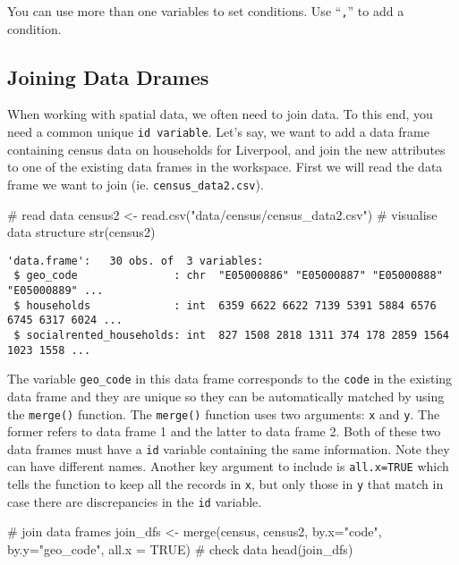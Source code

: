 \documentclass[
  letterpaper,
  krantz2]{style/krantz}
\newenvironment{Shaded}{\begin{snugshade}}{\end{snugshade}}
\newcommand{\AttributeTok}[1]{\textcolor[rgb]{0.40,0.45,0.13}{#1}}
\newcommand{\CommentTok}[1]{\textcolor[rgb]{0.37,0.37,0.37}{#1}}
\newcommand{\ConstantTok}[1]{\textcolor[rgb]{0.56,0.35,0.01}{#1}}
\newcommand{\FunctionTok}[1]{\textcolor[rgb]{0.28,0.35,0.67}{#1}}
\newcommand{\NormalTok}[1]{\textcolor[rgb]{0.00,0.23,0.31}{#1}}
\newcommand{\OtherTok}[1]{\textcolor[rgb]{0.00,0.23,0.31}{#1}}
\newcommand{\StringTok}[1]{\textcolor[rgb]{0.13,0.47,0.30}{#1}}
\begin{document}
You can use more than one variables to set conditions. Use
``\texttt{,}'' to add a condition.

\hypertarget{joining-data-drames}{%
\subsection{Joining Data Drames}\label{joining-data-drames}}

When working with spatial data, we often need to join data. To this end,
you need a common unique \texttt{id\ variable}. Let's say, we want to
add a data frame containing census data on households for Liverpool, and
join the new attributes to one of the existing data frames in the
workspace. First we will read the data frame we want to join (ie.
\texttt{census\_data2.csv}).

\begin{Shaded}
\begin{Highlighting}[]
\CommentTok{\# read data}
\NormalTok{census2 }\OtherTok{\textless{}{-}} \FunctionTok{read.csv}\NormalTok{(}\StringTok{"data/census/census\_data2.csv"}\NormalTok{)}
\CommentTok{\# visualise data structure}
\FunctionTok{str}\NormalTok{(census2)}
\end{Highlighting}
\end{Shaded}

\begin{verbatim}
'data.frame':   30 obs. of  3 variables:
 $ geo_code               : chr  "E05000886" "E05000887" "E05000888" "E05000889" ...
 $ households             : int  6359 6622 6622 7139 5391 5884 6576 6745 6317 6024 ...
 $ socialrented_households: int  827 1508 2818 1311 374 178 2859 1564 1023 1558 ...
\end{verbatim}

The variable \texttt{geo\_code} in this data frame corresponds to the
\texttt{code} in the existing data frame and they are unique so they can
be automatically matched by using the \texttt{merge()} function. The
\texttt{merge()} function uses two arguments: \texttt{x} and \texttt{y}.
The former refers to data frame 1 and the latter to data frame 2. Both
of these two data frames must have a \texttt{id} variable containing the
same information. Note they can have different names. Another key
argument to include is \texttt{all.x=TRUE} which tells the function to
keep all the records in \texttt{x}, but only those in \texttt{y} that
match in case there are discrepancies in the \texttt{id} variable.

\begin{Shaded}
\begin{Highlighting}[]
\CommentTok{\# join data frames}
\NormalTok{join\_dfs }\OtherTok{\textless{}{-}} \FunctionTok{merge}\NormalTok{(census, census2, }\AttributeTok{by.x=}\StringTok{"code"}\NormalTok{, }\AttributeTok{by.y=}\StringTok{"geo\_code"}\NormalTok{, }\AttributeTok{all.x =} \ConstantTok{TRUE}\NormalTok{)}
\CommentTok{\# check data}
\FunctionTok{head}\NormalTok{(join\_dfs)}
\end{Highlighting}
\end{Shaded}
\end{document}
